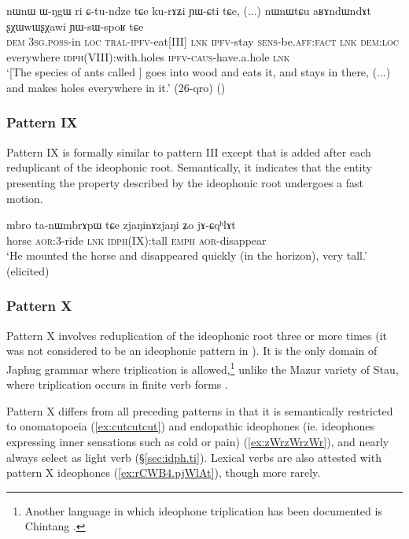 \begin{exe} 
\ex \label{ex:sxXwwWsxWawi}
\gll nɯnɯ ɯ-ŋgɯ ri ɕ-tu-ndze tɕe ku-rɤʑi ɲɯ-ɕti tɕe, (...) nɯnɯtɕu aʁɤndɯndɤt ʂχɯwɯʂχawi ɲɯ-sɯ-spoʁ tɕe \\
\textsc{dem} \textsc{3sg}.\textsc{poss}-in \textsc{loc} \textsc{tral}-\textsc{ipfv}-eat[III] \textsc{lnk} \textsc{ipfv}-stay \textsc{sens}-be.\textsc{aff}:\textsc{fact} \textsc{lnk} {  } \textsc{dem}:\textsc{loc} everywhere \textsc{idph}(VIII):with.holes \textsc{ipfv}-\textsc{caus}-have.a.hole \textsc{lnk} \\
\glt `[The species of ants called ] goes into wood and eats it, and stays in there, (...) and makes holes everywhere in it.' (26-qro)
()
\end{exe} 

\subsubsection{Pattern IX} \label{sec:ideo.IX}
Pattern IX is formally similar to pattern III except that  is added after each reduplicant of the ideophonic root. Semantically, it indicates that the entity presenting the property described by the ideophonic root undergoes a fast motion.

\begin{exe} 
\ex  \label{ex:ideo9}
\gll  mbro ta-nɯmbrɤpɯ tɕe zjaŋinɤzjaŋi ʑo jɤ-ɕqʰlɤt   \\
horse \textsc{aor}:3\flobv{}-ride \textsc{lnk} \textsc{idph}(IX):tall \textsc{emph} \textsc{aor}-disappear \\
\glt `He mounted the horse and disappeared quickly (in the horizon), very tall.'  (elicited)
 \end{exe}

 
\subsubsection{Pattern X} \label{sec:ideo.X}
Pattern X involves reduplication of the ideophonic root three or more times (it was not considered to be an ideophonic pattern in \citealt{japhug14ideophones}). It is the only domain of Japhug grammar where triplication is allowed,\footnote{Another language in which ideophone triplication has been documented is Chintang \citep{rai06triplication}.
} unlike the Mazur variety of Stau, where triplication occurs in finite verb forms \citep{gates17triplication}.

Pattern X differs from all preceding patterns in that it is semantically restricted to onomatopoeia (\ref{ex:cutcutcut}) and endopathic ideophones (ie. ideophones expressing inner sensations such as cold or pain) (\ref{ex:zWrzWrzWr}), and nearly always select  as light verb (§\ref{sec:idph.ti}). Lexical verbs are also attested with pattern X ideophones (\ref{ex:rCWB4.pjWlAt}), though more rarely.
 

